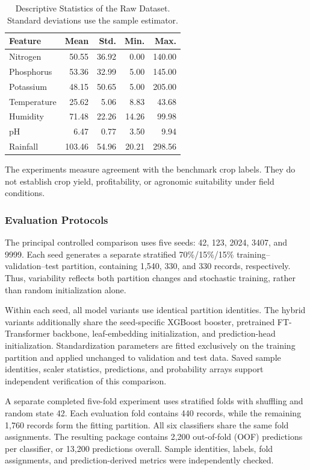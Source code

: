 \begin{table}[t]
\centering
\caption{Descriptive Statistics of the Raw Dataset.
Standard deviations use the sample estimator.}
\label{tab:dataset_stats}
\small
\begin{tabular}{lrrrr}
\hline
Feature & Mean & Std. & Min. & Max. \\
\hline
Nitrogen    & 50.55  & 36.92 & 0.00  & 140.00 \\
Phosphorus  & 53.36  & 32.99 & 5.00  & 145.00 \\
Potassium   & 48.15  & 50.65 & 5.00  & 205.00 \\
Temperature & 25.62  & 5.06  & 8.83  & 43.68  \\
Humidity    & 71.48  & 22.26 & 14.26 & 99.98  \\
pH          & 6.47   & 0.77  & 3.50  & 9.94   \\
Rainfall    & 103.46 & 54.96 & 20.21 & 298.56 \\
\hline
\end{tabular}
\end{table}

The experiments measure agreement with the benchmark crop labels.
They do not establish crop yield, profitability, or agronomic
suitability under field conditions.

\subsubsection{Evaluation Protocols}

The principal controlled comparison uses five seeds:
42, 123, 2024, 3407, and 9999. Each seed generates a separate
stratified 70\%/15\%/15\% training--validation--test partition,
containing 1,540, 330, and 330 records, respectively.
Thus, variability reflects both partition changes and stochastic
training, rather than random initialization alone.

Within each seed, all model variants use identical partition
identities. The hybrid variants additionally share the seed-specific
XGBoost booster, pretrained FT-Transformer backbone, leaf-embedding
initialization, and prediction-head initialization. Standardization
parameters are fitted exclusively on the training partition and applied
unchanged to validation and test data. Saved sample identities,
scaler statistics, predictions, and probability arrays support
independent verification of this comparison.

A separate completed five-fold experiment uses
stratified folds with shuffling and random state 42.
Each evaluation fold contains 440 records, while the remaining
1,760 records form the fitting partition. All six classifiers share
the same fold assignments. The resulting package contains
2,200 out-of-fold (OOF) predictions per classifier, or
13,200 predictions overall. Sample identities, labels, fold
assignments, and prediction-derived metrics were independently checked.

